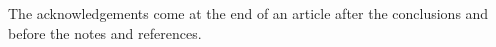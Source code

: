 \documentclass[twoside,twocolumn,9pt]{article}
\renewcommand{\refname}{Notes and references}
\begin{document}
The acknowledgements come at the end of an article after the conclusions and before the notes and references. 



\balance


\end{document}
